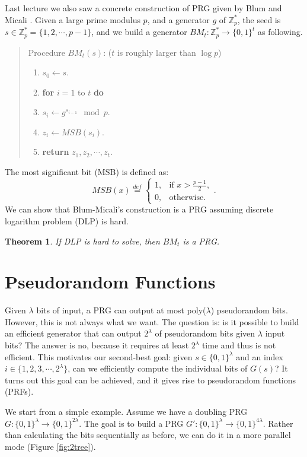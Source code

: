\documentclass[12pt]{article}
\newcommand{\eqdef}{\stackrel{def}{=}}
\newcommand{\Z}{\mathbb{Z}}
\newcommand{\bits}{\{0,1\}}
\newcommand{\tab}{\hspace{0.3in}}
\newtheorem{theorem}{Theorem}[section]
\theoremstyle{definition}
\begin{document}
Last lecture we also saw a concrete construction of PRG given by Blum and Micali \cite{BM84}.
Given a large prime modulus $p$, and a generator $g$ of $\Z_p^*$, the seed is $s \in \Z_p^* = \{1,2,\cdots,p-1\}$, and we build a generator $BM_t : \Z_p^* \to \bits^t$ as following.
\begin{quote}
Procedure $BM_t(s)$: ($t$ is roughly larger than $\log p$)
\begin{enumerate}
\item $s_0 \gets s$.
\item {\bf for} $i=1$ to $t$ {\bf do}
\item \tab $s_i \gets g^{s_{i-1}} \mod p$.
\item \tab $z_i \gets MSB(s_i)$.
\item {\bf return} $z_1,z_2,\cdots,z_t$.
\end{enumerate}
\end{quote}
The most significant bit (MSB) is defined as:
$$MSB(x) \eqdef \begin{cases}
1, & \textrm{if } x>\frac{p-1}{2}, \\
0, & \textrm{otherwise.}
\end{cases}.$$
We can show that Blum-Micali's construction is a PRG assuming discrete logarithm problem (DLP) is hard.
\begin{theorem}
If DLP is hard to solve, then $BM_t$ is a PRG.
\end{theorem}

\section{Pseudorandom Functions}
Given $\lambda$ bits of input, a PRG can output at most poly($\lambda$) pseudorandom bits. 
However, this is not always what we want.
The question is: is it possible to build an efficient generator that can output $2^\lambda$ of pseudorandom bits given $\lambda$ input bits?
The answer is no, because it requires at least $2^\lambda$ time and thus is not efficient. This motivates our second-best goal: given $s\in\bits^\lambda$ and an index $i\in\{1,2,3,\cdots,2^\lambda\}$, can we efficiently compute the individual bits of $G(s)$?
It turns out this goal can be achieved, and it gives rise to pseudorandom functions (PRFs).

We start from a simple example. Assume we have a doubling PRG $G : \bits^\lambda \to \bits^{2\lambda}$. The goal is to build a PRG $G' : \bits^\lambda \to \bits^{4\lambda}$. Rather than calculating the bits sequentially as before, we can do it in a more parallel mode (Figure \ref{fig:2tree}). 
\end{document}
